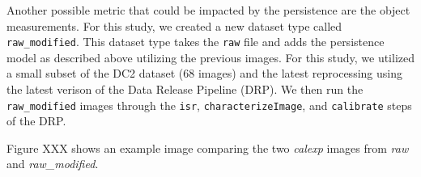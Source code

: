 \documentclass[DM,authoryear,toc]{lsstdoc}
\begin{document}
Another possible metric that could be impacted by the persistence are the object measurements.
For this study, we created a new dataset type called \texttt{raw_modified}. 
This dataset type takes the \texttt{raw} file and adds the persistence model as described above utilizing the previous images.
For this study, we utilized a small subset of the DC2 dataset (68 images) and the latest reprocessing using the latest verison of the Data Release Pipeline (DRP).
We then run the \texttt{raw_modified} images through the \texttt{isr}, \texttt{characterizeImage}, and \texttt{calibrate} steps of the DRP.

Figure XXX shows an example image comparing the two \textit{calexp} images from \textit{raw} and \textit{raw_modified}.






\end{document}
